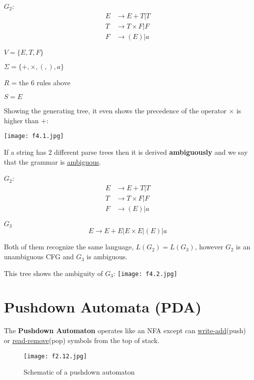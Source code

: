 \begin{example}[CFG]
    \(G_2\):
    \begin{align*}
        E &\rightarrow E + T | T \\
        T &\rightarrow T \times F | F \\
        F &\rightarrow (E) | a
    \end{align*}  

    \(V = \{ E, T, F \} \) 

    \(\Sigma = \{ +, \times, (, ), a \} \) 

    \(R\) = the 6 rules above 

    \(S = E\) 

    Showing the generating tree, it even shows the precedence of the operator \(\times\) is higher than \(+\):

    \texttt{[image: f4.1.jpg]}

    If a string has 2 different parse trees then it is derived \textbf{ambiguously} and we say that the grammar is \underline{ambiguous}.
\end{example}

\begin{example}[Ambiguity]
    \(G_2\):
    \begin{align*}
        E &\rightarrow E + T | T \\
        T &\rightarrow T \times F | F \\
        F &\rightarrow (E) | a
    \end{align*} 

    \(G_3\) 
    \[
        E \rightarrow E +E |E \times E | (E) | a
    \]

    Both of them recognize the same language, \(L(G_2) = L(G_3)\), however \(G_2\) is an unambiguous CFG and \(G_3\) is ambiguous. 

    This tree shows the ambiguity of \(G_3\):
    \texttt{[image: f4.2.jpg]} 
\end{example}

\section{Pushdown Automata (PDA)}

The \textbf{Pushdown Automaton} operates like  an NFA except can \underline{write-add}(push) or \underline{read-remove}(pop) symbols from the top of stack.

\begin{figure}[h]
    \centering
    \texttt{[image: f2.12.jpg]}
    \caption{Schematic of a pushdown automaton}
\end{figure}

